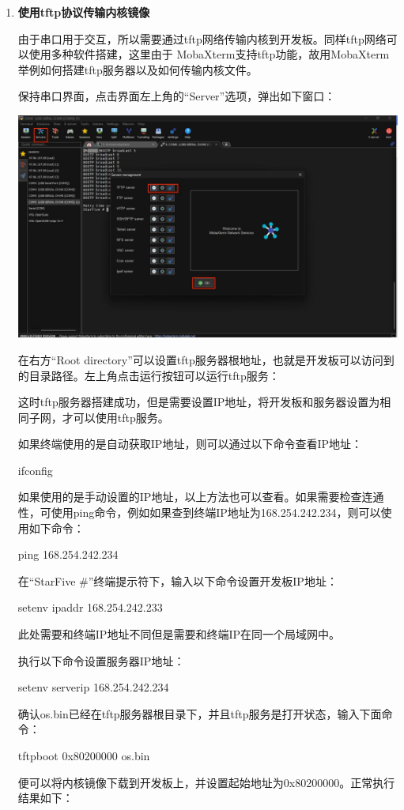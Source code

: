 {\begin{enumerate}
	此时开发板和终端已通过串口连接，终端可以使用命令与开发板进行交互。
	
	\item \textbf{使用tftp协议传输内核镜像}
	
	由于串口用于交互，所以需要通过tftp网络传输内核到开发板。同样tftp网络可以使用多种软件搭建，这里由于
	MobaXterm支持tftp功能，故用MobaXterm举例如何搭建tftp服务器以及如何传输内核文件。
	
	保持串口界面，点击界面左上角的“Server”选项，弹出如下窗口：
	
	\centering
	\includegraphics[width=0.58\linewidth]{figures/08-02-tftp服务器搭建.jpg}
	\raggedright
	
	在右方“Root directory”可以设置tftp服务器根地址，也就是开发板可以访问到的目录路径。左上角点击运行按钮可以运行tftp服务：
	
	这时tftp服务器搭建成功，但是需要设置IP地址，将开发板和服务器设置为相同子网，才可以使用tftp服务。
	
	如果终端使用的是自动获取IP地址，则可以通过以下命令查看IP地址：
	
	ifconfig
	
	如果使用的是手动设置的IP地址，以上方法也可以查看。如果需要检查连通性，可使用ping命令，例如如果查到终端IP地址为168.254.242.234，则可以使用如下命令：
	
	ping 168.254.242.234
	
	在“StarFive \#”终端提示符下，输入以下命令设置开发板IP地址：
	
	setenv ipaddr 168.254.242.233
	
	此处需要和终端IP地址不同但是需要和终端IP在同一个局域网中。
	
	执行以下命令设置服务器IP地址：
	
	setenv serverip 168.254.242.234
	
	确认os.bin已经在tftp服务器根目录下，并且tftp服务是打开状态，输入下面命令：
	
	tftpboot 0x80200000 os.bin
	
	便可以将内核镜像下载到开发板上，并设置起始地址为0x80200000。正常执行结果如下：
	

\end{enumerate}}
